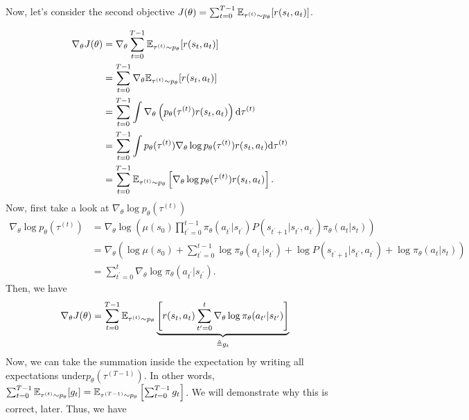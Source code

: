 \documentclass{article}
\begin{document}
Now, let's consider the second objective $J(\theta) = \sum_{t=0}^{T-1} \BBE_{\tau^{(t)} \sim p_\theta}[r(s_t, a_t)]$.
\begin{tcolorbox}[breakable,enhanced,colback=gray!10!white,colframe=gray!50!black,
title={Policy Gradient Derivation for $J(\theta) = \sum_{t=0}^{T-1} \BBE_{\tau^{(t)} \sim p_\theta}[r(s_t, a_t)]$}]

\begin{align*}
\nabla_\theta J(\theta) &= \nabla_\theta \sum_{t=0}^{T-1} {\mathbb E}_{\tau^{(t)} \sim p_\theta}[r(s_t, a_t)] \\
&= \sum_{t=0}^{T-1} \nabla_\theta {\mathbb E}_{\tau^{(t)} \sim p_\theta}[r(s_t, a_t)] \\
&= \sum_{t=0}^{T-1} \int \nabla_\theta \left(p_\theta(\tau^{(t)}) r(s_t, a_t)\right) {\rm d}\tau^{(t)} \\
&= \sum_{t=0}^{T-1} \int p_\theta(\tau^{(t)}) \nabla_\theta \log p_\theta(\tau^{(t)}) r(s_t, a_t) {\rm d}\tau^{(t)} \\
&= \sum_{t=0}^{T-1} {\mathbb E}_{\tau^{(t)} \sim p_\theta} \left[\nabla_\theta \log p_\theta(\tau^{(t)}) r(s_t, a_t)\right].
\end{align*}
Now, first take a look at $\nabla_\theta \log p_\theta(\tau^{(t)})$
\begin{align*}
\nabla_\theta \log p_\theta(\tau^{(t)}) &= \nabla_\theta \log \left( \mu(s_0)\prod_{t^\prime = 0}^{t-1} \pi_\theta(a_{t^\prime}|s_{t^\prime})P(s_{t^\prime+1}|s_{t^\prime}, a_{t^\prime}) \pi_\theta(a_t|s_t)\right)\\
&= \nabla_\theta \left(\log\mu(s_0)+\sum_{t^\prime = 0}^{t-1} \log \pi_\theta(a_{t^\prime}|s_{t^\prime}) + \log P(s_{t^\prime+1}|s_{t^\prime}, a_{t^\prime}) + \log \pi_\theta(a_t|s_t)\right)\\
&= \sum_{t^\prime = 0}^{t} \nabla_\theta \log \pi_\theta(a_{t^\prime}|s_{t^\prime}).
\end{align*}
Then, we have
\begin{align*}
    \nabla_\theta J(\theta) &= \sum_{t=0}^{T-1} {\mathbb E}_{\tau^{(t)} \sim p_\theta}  \underbrace{\left[r(s_t, a_t)\sum_{t^\prime = 0}^{t} \nabla_\theta \log \pi_\theta(a_{t^\prime}|s_{t^\prime})\right]}_{\triangleq g_t}
\end{align*}
Now, we can take the summation inside the expectation by writing all expectations under$p_\theta(\tau^{(T-1)})$. In other words, $\sum_{t=0}^{T-1} {\mathbb E}_{\tau^{(t)} \sim p_\theta}[g_t] = {\mathbb E}_{\tau^{(T-1)} \sim p_\theta}\left[\sum_{t=0}^{T-1} g_t\right]$. We will demonstrate why this is correct, later. Thus, we have


\end{tcolorbox}
\end{document}
